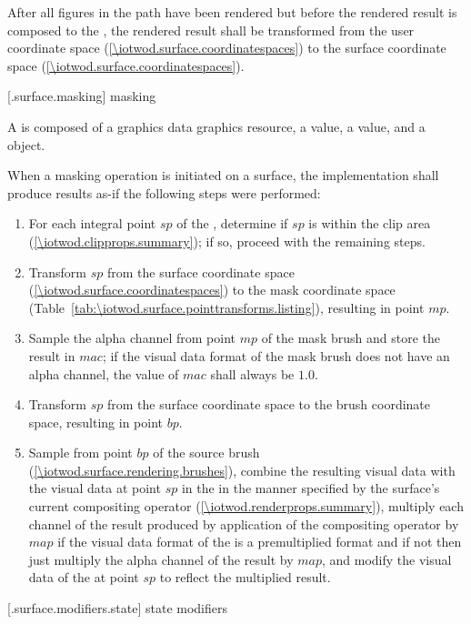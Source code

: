 \pnum
After all figures in the path have been rendered but before the rendered result is composed to the \underlyingsurface, the rendered result shall be transformed from the user coordinate space (\ref{\iotwod.surface.coordinatespaces}) to the surface coordinate space (\ref{\iotwod.surface.coordinatespaces}).

 [\iotwod.surface.masking] { masking}

\pnum
A  is composed of a graphics data graphics resource, a  value, a  value, and a  object.

\pnum
When a masking operation is initiated on a surface, the implementation shall produce results as-if the following steps were performed:

\begin{enumerate}
\item For each integral point $sp$ of the \underlyingsurface, determine if $sp$ is within the clip area (\ref{\iotwod.clipprops.summary}); if so, proceed with the remaining steps.
\item Transform $sp$ from the surface coordinate space (\ref{\iotwod.surface.coordinatespaces}) to the mask coordinate space (Table~\ref{tab:\iotwod.surface.pointtransforms.listing}), resulting in point $mp$.
\item Sample the alpha channel from point $mp$ of the mask brush and store the result in $mac$; if the visual data format of the mask brush does not have an alpha channel, the value of $mac$ shall always be $1.0$.
\item Transform $sp$ from the surface coordinate space to the brush coordinate space, resulting in point $bp$.
\item Sample from point $bp$ of the source brush (\ref{\iotwod.surface.rendering.brushes}), combine the resulting visual data with the visual data at point $sp$ in the \underlyingsurface in the manner specified by the surface's current compositing operator (\ref{\iotwod.renderprops.summary}), multiply each channel of the result produced by application of the compositing operator by $map$ if the visual data format of the \underlyingsurface is a premultiplied format and if not then just multiply the alpha channel of the result by $map$, and modify the visual data of the \underlyingsurface at point $sp$ to reflect the multiplied result.
\end{enumerate}

 [\iotwod.surface.modifiers.state] { state modifiers}

